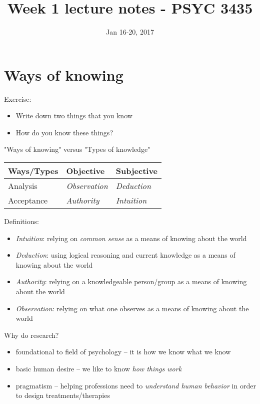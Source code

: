 \documentclass[11pt]{article}
\date{Jan 16-20, 2017}
\title{Week 1 lecture notes - PSYC 3435}
\begin{document}
\maketitle

\section*{Ways of knowing}
\label{sec-1}
Exercise:
\begin{itemize}
\item Write down two things that you know
\item How do you know these things?
\end{itemize}

"Ways of knowing" versus "Types of knowledge"
\begin{center}
\begin{tabular}{lll}
Ways/Types & Objective & Subjective\\
\hline
Analysis & \emph{Observation} & \emph{Deduction}\\
Acceptance & \emph{Authority} & \emph{Intuition}\\
\hline
\end{tabular}
\end{center}


Definitions:
\begin{itemize}
\item \emph{Intuition}: relying on \emph{common sense} as a means of knowing about the world
\item \emph{Deduction}: using logical reasoning and current knowledge as a means of knowing about the world
\item \emph{Authority}: relying on a knowledgeable person/group as a means of knowing about the world
\item \emph{Observation}: relying on what one observes as a means of knowing about the world
\end{itemize}

Why do research?
\begin{itemize}
\item foundational to field of psychology -- it is how we know what we know
\item basic human desire -- we like to know \emph{how things work}
\item pragmatism -- helping professions need to \emph{understand human behavior} in order to design treatments/therapies
\end{itemize}
\end{document}
